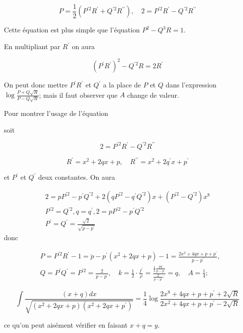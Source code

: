 \documentclass{article}
\begin{document}
\[
P=\frac{1}{2}\left(P^{\prime 2} R^{\prime}+Q^{\prime 2} R^{\prime \prime}\right), \quad 2=P^{\prime 2} R^{\prime}-Q^{\prime 2} R^{\prime \prime}
\]

Cette équation est plus simple que l'équation \(P^{2}-Q^{3} R=1\).

En multipliant par \(R^{\prime}\) on aura

\[
\left(P^{\prime} R^{\prime}\right)^{2}-Q^{\prime 2} R=2 R^{\prime}
\]

On peut donc mettre \(P^{\prime} R^{\prime}\) et \(Q^{\prime}\) a la place de \(P\) et \(Q\) dans l'expression \(\log \frac{P+Q \sqrt{R}}{P-Q \sqrt{R}}\); mais il faut observer que \(A\) change de valeur.

Pour montrer l'usage de l'équation

soit

\[
2=P^{\prime 2} R^{\prime}-Q^{\prime 2} R^{\prime \prime}
\]

\[
R^{\prime}=x^{2}+2 q x+p, \quad R^{\prime \prime}=x^{2}+2 q^{\prime} x+p^{\prime}
\]

et \(P^{\prime}\) et \(Q^{\prime}\) deux constantes. On aura

\[
\begin{gathered}
2=p P^{\prime 2}-p^{\prime} Q^{\prime 2}+2\left(q P^{\prime 2}-q^{\prime} Q^{\prime 2}\right) x+\left(P^{\prime 2}-Q^{\prime 2}\right) x^{8} \\
P^{\prime 2}=Q^{\prime 2}, q=q^{\prime}, 2=p P^{\prime 2}-p^{\prime} Q^{\prime 2} \\
P^{\prime}=Q^{\prime}=\frac{\sqrt{2}}{\sqrt{p-p^{\prime}}}
\end{gathered}
\]
donc

\[
\begin{aligned}
& P=P^{\prime 2} R^{\prime}-1=\ddot{p}-p^{\prime}\left(x^{2}+2 q x+p\right)-1=\frac{2 x^{2}+4 q x+p+p^{\prime}}{p-p^{\prime}}, \\
& Q=P^{\prime} Q^{\prime}=P^{\prime 2}=\frac{2}{p-p^{\prime}}, \quad k=\frac{1}{2} \cdot \frac{f^{\prime}}{\rho}=\frac{\frac{1}{2} \frac{p q}{p-p^{\prime}}}{\frac{2}{p-p^{\prime}}:}=q, \quad A=\frac{1}{4} ;
\end{aligned}
\]

\[
\int \frac{(x+q) d x}{\sqrt{\left(x^{2}+2 q x+p\right)\left(x^{2}+2 q x+p^{\prime}\right)}}=\frac{1}{4} \log \frac{2 x^{8}+4 q x+p+p^{\prime}+2 \sqrt{R}}{2 x^{2}+4 q x+p+p^{\prime}-2 \sqrt{R}}
\]

ce qu'on peut aisément vérifier en faisant \(x+q=y\).
\end{document}
